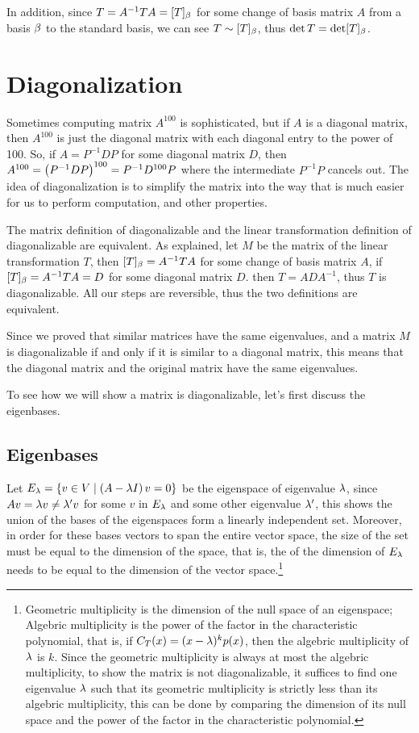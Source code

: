 \documentclass[11pt, cyan, night, 1in]{LatexTemplate/hw}
\begin{document}
In addition, since $T=A^{-1}TA=[T]_\beta$ for some change of basis matrix $A$ from a basis $\beta$ to the standard basis, we can see $T\sim [T]_\beta$, thus $\det T = \det [T]_\beta$.

\section{Diagonalization}

Sometimes computing matrix $A^{100}$ is sophisticated, but if $A$ is a diagonal matrix, then $A^{100}$ is just the diagonal matrix with each diagonal entry to the power of 100. So, if $A=P^{-1}DP$ for some diagonal matrix $D$, then $A^{100}=\left(P^{-1}DP\right)^{100}=P^{-1}D^{100}P$ where the intermediate $P^{-1}P$ cancels out. The idea of diagonalization is to simplify the matrix into the way that is much easier for us to perform computation, and other properties. 

The matrix definition of diagonalizable and the linear transformation definition of diagonalizable are equivalent. As explained, let $M$ be the matrix of the linear transformation $T$, then $[T]_\beta=A^{-1}TA$ for some change of basis matrix $A$, if $[T]_\beta=A^{-1}TA=D$ for some diagonal matrix $D$. then $T=ADA^{-1}$, thus $T$ is diagonalizable. All our steps are reversible, thus the two definitions are equivalent.

Since we proved that similar matrices have the same eigenvalues, and a matrix $M$ is diagonalizable if and only if it is similar to a diagonal matrix, this means that the diagonal matrix and the original matrix  have the same eigenvalues.

To see how we will show a matrix is diagonalizable, let's first discuss the eigenbases.

\subsection{Eigenbases}

Let $E_\lambda=\{v\in V\mid \left(A-\lambda I\right) v = 0\}$ be the eigenspace of eigenvalue $\lambda$, since $Av=\lambda v\ne \lambda' v$ for some $v$ in $E_\lambda$ and some other eigenvalue $\lambda'$, this shows the union of the bases of the eigenspaces form a linearly independent set. Moreover, in order for these bases vectors to span the entire vector space, the size of the set must be equal to the dimension of the space, that is, the  of the dimension of  $E_\lambda$ needs to be equal to the dimension of the vector space.\footnote{Geometric multiplicity is the dimension of the null space of an eigenspace; Algebric multiplicity is the power of the factor in the characteristic polynomial, that is, if $C_T(x)=(x-\lambda)^k p(x)$, then the algebric multiplicity of $\lambda$ is $k$. Since the geometric multiplicity is always at most the algebric multiplicity, to show the matrix is not diagonalizable, it suffices to find one eigenvalue $\lambda$ such that its geometric multiplicity is strictly less than its algebric multiplicity, this can be done by comparing the dimension of its null space and the power of the factor in the characteristic polynomial.}
\end{document}
